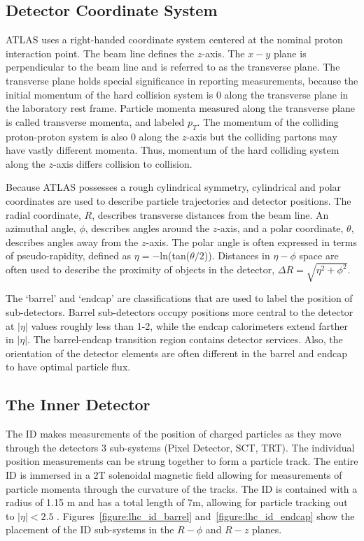 \subsection{Detector Coordinate System}

ATLAS uses a right-handed  coordinate system centered at the nominal proton interaction point. The beam line defines the $z$-axis. The $x-y$ plane is perpendicular to the beam line and is referred to as the transverse plane. The transverse plane holds special significance in reporting measurements, because the initial momentum of the hard collision system is 0 along the transverse plane in the laboratory rest frame. Particle momenta measured along the transverse plane is called transverse momenta, and labeled $p_T$.  The momentum of the colliding proton-proton system is also 0 along the $z$-axis but the colliding partons may have vastly different momenta. Thus, momentum of the hard colliding system along the $z$-axis differs collision to collision. 

Because ATLAS possesses a rough cylindrical symmetry, cylindrical and polar coordinates are used to describe particle trajectories and detector positions. The radial coordinate, $R$, describes transverse distances from the beam line. An azimuthal angle, $\phi$, describes angles around the $z$-axis, and a polar coordinate, $\theta$, describes angles away from the $z$-axis. The polar angle is often expressed in terms of pseudo-rapidity, defined as $\eta=-$ln(tan($\theta/2$)). Distances in $\eta-\phi$ space are often used to describe the proximity of objects in the detector, $\Delta R = \sqrt{\eta^2 + \phi^2}$.

The `barrel' and `endcap' are classifications that are used to label the position of sub-detectors. Barrel sub-detectors occupy positions more central to the detector at $|\eta|$ values roughly less than 1-2, while the endcap calorimeters extend farther in $|\eta|$. The barrel-endcap transition region contains detector services. Also, the orientation of the detector elements are often different in the barrel and endcap to have optimal particle flux.  

\subsection{The Inner Detector}

The ID makes measurements of the position of charged particles as they move through the detectors 3 sub-systems (Pixel Detector, SCT, TRT). The individual position measurements can be strung together to form a particle track. The entire ID is immersed in a 2T solenoidal magnetic field allowing for measurements of particle momenta through the curvature of the tracks. The ID is contained with a radius of 1.15 m and has a total length of 7m, allowing for particle tracking out to $|\eta| < 2.5$ . Figures~\ref{figure:lhc_id_barrel} and~\ref{figure:lhc_id_endcap} show the placement of the ID sub-systems in the $R-\phi$ and $R-z$ planes.  


